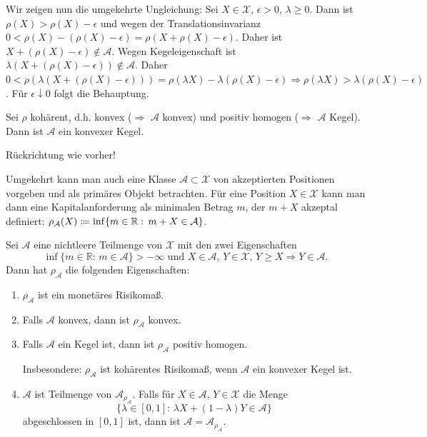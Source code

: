 \documentclass[a4paper,twoside,DIV15,BCOR12mm]{scrbook}
\begin{document}
\begin{beweis}
\begin{enumerate}
Wir zeigen nun die umgekehrte Ungleichung: Sei $X\in\mathcal{X},\, \epsilon>0,\, \lambda\geq 0$. Dann ist $\rho(X)>\rho(X)-\epsilon$ und wegen der Translationsinvarianz $0<\rho(X)-(\rho(X)-\epsilon)=\rho(X+\rho(X)-\epsilon)$. Daher ist $X+(\rho(X)-\epsilon)\notin\mathcal{A}$. Wegen Kegeleigenschaft ist $\lambda(X+(\rho(X)-\epsilon))\notin\mathcal{A}$. Daher $0<\rho(\lambda(X+(\rho(X)-\epsilon)))=\rho(\lambda X)-\lambda(\rho(X)-\epsilon) \Rightarrow \rho(\lambda X)>\lambda(\rho(X)-\epsilon)$. Für $\epsilon \downarrow 0$ folgt die Behauptung.

Sei $\rho$ kohärent, d.h. konvex ($\Rightarrow$ $\mathcal{A}$ konvex) und positiv homogen ($\Rightarrow$ $\mathcal{A}$ Kegel). Dann ist $\mathcal{A}$ ein konvexer Kegel.

Rückrichtung wie vorher!
\end{enumerate}
\end{beweis}

Umgekehrt kann man auch eine Klasse $\mathcal{A}\subset \mathcal{X}$ von akzeptierten Positionen vorgeben und als primäres Objekt betrachten. Für eine Position $X\in\mathcal{X}$ kann man dann eine Kapitalanforderung als minimalen Betrag $m$, der $m+X$ akzeptal definiert: $\rho_\mathcal{A}(X)\da\inf\{m\in\mathbb{R}:\, m+X\in\mathcal{A}\}$.

\begin{satz}
Sei $\mathcal{A}$ eine nichtleere Teilmenge von $\mathcal{X}$ mit den zwei Eigenschaften
\[
\inf\{m\in\mathbb{R}:\, m\in\mathcal{A}\}>-\infty \text{ und } X\in\mathcal{A},\, Y\in\mathcal{X},\, Y\geq X \Rightarrow Y\in\mathcal{A}.
\]
Dann hat $\rho_\mathcal{A}$ die folgenden Eigenschaften:
\begin{enumerate}
\item $\rho_\mathcal{A}$ ist ein monetäres Risikomaß.
\item Falls $\mathcal{A}$ konvex, dann ist $\rho_\mathcal{A}$ konvex.
\item Falls $\mathcal{A}$ ein Kegel ist, dann ist $\rho_\mathcal{A}$ positiv homogen.

Insbesondere: $\rho_\mathcal{A}$ ist kohärentes Risikomaß, wenn $\mathcal{A}$ ein konvexer Kegel ist.
\item $\mathcal{A}$ ist Teilmenge von $\mathcal{A}_{\rho_\mathcal{A}}$. Falls für $X\in\mathcal{A},\, Y\in\mathcal{X}$ die Menge 
\[
\{\lambda\in [0,1]:\, \lambda X+(1-\lambda)Y\in\mathcal{A}\}
\]
abgeschlossen in $[0,1]$ ist, dann ist $\mathcal{A}=\mathcal{A}_{\rho_\mathcal{A}}$.
\end{enumerate}
\end{satz}
\end{document}
